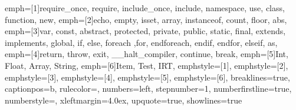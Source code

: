 \everymath{\displaystyle}

 {
	emph=[1]{require_once, require, include_once, include, namespace, use, class, function, new},
	emph=[2]{echo, empty, isset, array, instanceof, count, floor, abs},
	emph=[3]{var, const, abstract, protected, private, public, static, final, extends, implements, global, if, else, foreach ,for, endforeach, endif, endfor, elseif, as},
	emph=[4]{return, throw, exit, __halt_compiler, continue, break},
	emph=[5]{Int, Float, Array, String},
	emph=[6]{Item, Test, IRT},
	emphstyle=[1]\color{mBlue},
	emphstyle=[2]\color{mTeal},
	emphstyle=[3]\color{mBlue},
	emphstyle=[4]\color{mRed},
	emphstyle=[5]\color{mDeepOrange},
	emphstyle=[6]\color{mPink},
	breaklines=true,
	captionpos=b,
	rulecolor=\color{black},
	numbers=left,
	stepnumber=1,  
	numberfirstline=true,
	numberstyle=\footnotesize,
	xleftmargin=4.0ex,
	upquote=true,
	showlines=true
}
\lstset{style=mystyle}
\renewcommand{\lstlistingname}{Code}
\renewcommand{\lstlistlistingname}{Danh sách Code minh họa}



